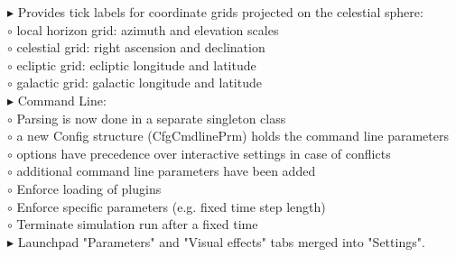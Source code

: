 \documentclass[Orbiter User Manual.tex]{subfiles}
\begin{document}
\begin{sloppypar}
$\blacktriangleright$ Provides tick labels for coordinate grids projected on the celestial sphere:\\
$\circ$ local horizon grid: azimuth and elevation scales\\
$\circ$ celestial grid: right ascension and declination\\
$\circ$ ecliptic grid: ecliptic longitude and latitude\\
$\circ$ galactic grid: galactic longitude and latitude\\
$\blacktriangleright$ Command Line:\\
$\circ$ Parsing is now done in a separate singleton class\\
$\circ$ a new Config structure (CfgCmdlinePrm) holds the command line parameters\\
$\circ$ options have precedence over interactive settings in case of conflicts\\
$\circ$ additional command line parameters have been added\\
$\circ$ Enforce loading of plugins\\
$\circ$ Enforce specific parameters (e.g. fixed time step length)\\
$\circ$ Terminate simulation run after a fixed time\\
$\blacktriangleright$ Launchpad "Parameters" and "Visual effects" tabs merged into "Settings".\\
\end{sloppypar}
\end{document}
